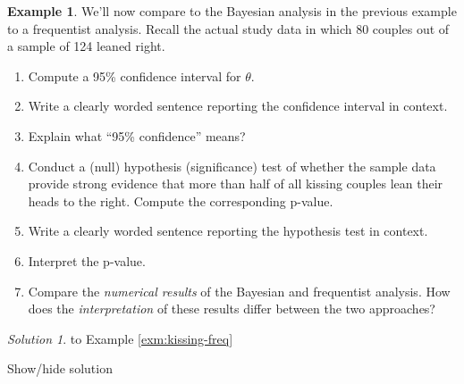 \documentclass[
]{book}
\providecommand{\tightlist}{%
  \setlength{\itemsep}{0pt}\setlength{\parskip}{0pt}}
\theoremstyle{definition}
\theoremstyle{definition}
\newtheorem{example}{Example}[chapter]
\theoremstyle{definition}
\theoremstyle{remark}
\newtheorem*{solution}{Solution}
\begin{document}
\begin{example}
\protect\hypertarget{exm:kissing-freq}{}{\label{exm:kissing-freq} }We'll now compare to the Bayesian analysis in the previous example to a frequentist analysis. Recall the actual study data in which 80 couples out of a sample of 124 leaned right.
\end{example}

\begin{enumerate}
\def\labelenumi{\arabic{enumi}.}
\tightlist
\item
  Compute a 95\% confidence interval for \(\theta\).
\item
  Write a clearly worded sentence reporting the confidence interval in context.
\item
  Explain what ``95\% confidence'' means?
\item
  Conduct a (null) hypothesis (significance) test of whether the sample data provide strong evidence that more than half of all kissing couples lean their heads to the right. Compute the corresponding p-value.
\item
  Write a clearly worded sentence reporting the hypothesis test in context.
\item
  Interpret the p-value.
\item
  Compare the \emph{numerical results} of the Bayesian and frequentist analysis. How does the \emph{interpretation} of these results differ between the two approaches?
\end{enumerate}

\begin{solution}
{}to Example \ref{exm:kissing-freq}
\end{solution}

Show/hide solution
\end{document}

